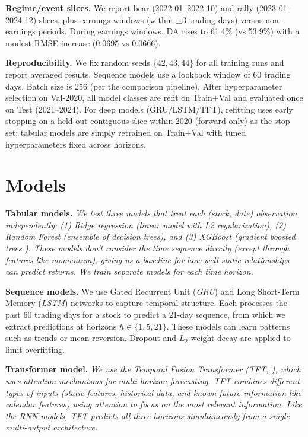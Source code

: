 \documentclass[conference,a4paper]{IEEEtran}
\newcommand{\simp}[1]{{\itshape #1}}
\newcommand{\da}{\ensuremath{\mathrm{DA}}}
\begin{document}
    	\textbf{Regime/event slices.} We report bear (2022-01--2022-10) and rally (2023-01--2024-12) slices, plus earnings windows (within $\pm3$ trading days) versus non-earnings periods. During earnings windows, \da{} rises to 61.4\% (vs 53.9\%) with a modest RMSE increase (0.0695 vs 0.0666).

	\textbf{Reproducibility.} We fix random seeds $\{42,43,44\}$ for all training runs and report averaged results. Sequence models use a lookback window of 60 trading days. Batch size is 256 (per the comparison pipeline). After hyperparameter selection on Val-2020, all model classes are refit on Train$+$Val and evaluated once on Test (2021--2024). For deep models (GRU/LSTM/TFT), refitting uses early stopping on a held-out contiguous slice within 2020 (forward-only) as the stop set; tabular models are simply retrained on Train$+$Val with tuned hyperparameters fixed across horizons.

\section{Models}
\textbf{Tabular models.} \simp{We test three models that treat each (stock, date) observation independently: (1) \textit{Ridge} regression (linear model with L2 regularization), (2) \textit{Random Forest} (ensemble of decision trees), and (3) \textit{XGBoost} (gradient boosted trees \citep{chen2016xgboost}). These models don't consider the time sequence directly (except through features like momentum), giving us a baseline for how well static relationships can predict returns. We train separate models for each time horizon.}

\textbf{Sequence models.} We use Gated Recurrent Unit (\textit{GRU}) \citep{cho2014learning} and Long Short-Term Memory (\textit{LSTM}) \citep{hochreiter1997long} networks to capture temporal structure. Each processes the past 60 trading days for a stock to predict a 21-day sequence, from which we extract predictions at horizons $h \in \{1,5,21\}$. These models can learn patterns such as trends or mean reversion. Dropout and $L_2$ weight decay are applied to limit overfitting.

	\textbf{Transformer model.} \simp{We use the Temporal Fusion Transformer (\textit{TFT}, \citealp{lim2021temporal}), which uses attention mechanisms for multi-horizon forecasting. TFT combines different types of inputs (static features, historical data, and known future information like calendar features) using attention to focus on the most relevant information. Like the RNN models, TFT predicts all three horizons simultaneously from a single multi-output architecture.}
\end{document}
